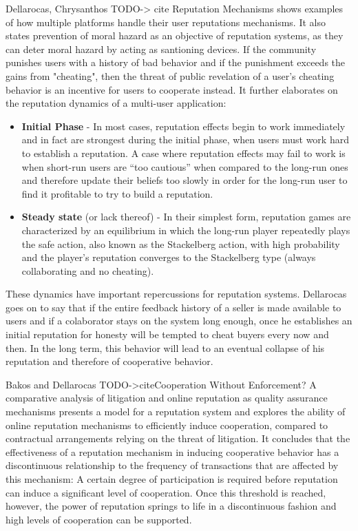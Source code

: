 Dellarocas, Chrysanthos TODO-> cite {Reputation Mechanisms} shows examples of how multiple platforms handle their user reputations mechanisms. It also states prevention of moral hazard as an objective of reputation systems, as they can deter moral hazard by acting as santioning devices. If the community punishes users with a history of bad behavior and if the punishment exceeds the gains from "cheating", then the threat of public revelation of a user's cheating behavior is an incentive for users to cooperate instead. It further elaborates on the reputation dynamics of a multi-user application: 
\begin{itemize}
    \item \textbf{Initial Phase} - In most cases, reputation effects begin to work immediately and in fact are strongest during the initial phase, when users must work hard to establish a reputation. A case where reputation effects may fail to work is when short-run users are “too cautious” when compared to the long-run ones and therefore update their beliefs too slowly in order for the long-run user to find it profitable to try to build a reputation.
    \item \textbf{Steady state} (or lack thereof) - In their simplest form, reputation games are characterized by an equilibrium in which the long-run player repeatedly plays the safe action, also known as the Stackelberg action, with high probability and the player’s reputation converges to the Stackelberg type (always collaborating and no cheating).
\end{itemize}

These dynamics have important repercussions for reputation systems. Dellarocas goes on to say that if the entire feedback history of a seller is made available to users and if a colaborator stays on the system long enough, once he establishes an initial reputation for honesty will be tempted to cheat buyers every now and then. In the long term, this behavior will lead to an eventual collapse of his reputation and therefore of cooperative behavior.

Bakos and  Dellarocas TODO->cite{Cooperation Without Enforcement? A comparative analysis of litigation and online reputation as quality assurance mechanisms} presents a model for a reputation system and explores the ability of online reputation mechanisms to efficiently induce cooperation, compared to contractual arrangements relying on the threat of litigation. It concludes that the effectiveness of a reputation mechanism in inducing cooperative behavior has a discontinuous relationship to the frequency of transactions that are affected by this mechanism: A certain degree of participation is required before reputation can induce a significant level of cooperation. Once this threshold is reached, however, the power of reputation springs to life in a discontinuous fashion and high levels of cooperation can be supported.

